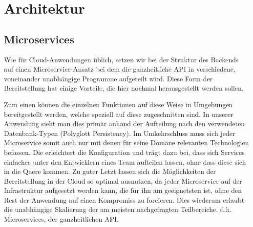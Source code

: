 \documentclass{article}
\begin{document}
\section{Architektur} %
\subsection{Microservices}

Wie für Cloud-Anwendungen üblich, setzen wir bei der Struktur des Backends auf einen Microservice-Ansatz bei dem die ganzheitliche API in verschiedene, voneinander unabhängige Programme aufgeteilt wird. Diese Form der Bereitstellung hat einige Vorteile, die hier nochmal herausgestellt werden sollen.

Zum einen können die einzelnen Funktionen auf diese Weise in Umgebungen bereitgestellt werden, welche speziell auf diese zugeschnitten sind. In unserer Anwendung sieht man dies primär anhand der Aufteilung nach den verwendeten Datenbank-Typen (Polyglott Persistency). Im Umkehrschluss muss sich jeder Microservice somit auch nur mit denen für seine Domäne relevanten Technologien befassen. Die erleichtert die Konfiguration und trägt dazu bei, dass sich Services einfacher unter den Entwicklern eines Team aufteilen lassen, ohne dass diese sich in die Quere kommen. Zu guter Letzt lassen sich die Möglichkeiten der Bereitstellung in der Cloud so optimal ausnutzen, da jeder Microservice auf der Infrastruktur aufgesetzt werden kann, die für ihn am geeignetsten ist, ohne den Rest der Anwendung auf einen Kompromiss zu forcieren. Dies wiederum erlaubt die unabhängige Skalierung der am meisten nachgefragten Teilbereiche, d.h. Microservices, der ganzheitlichen API.
\end{document}
